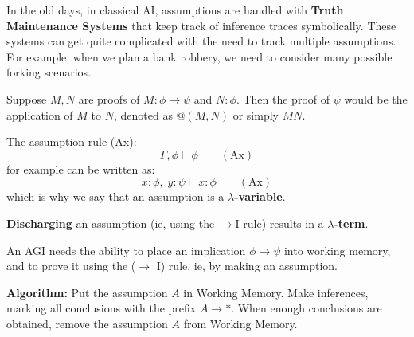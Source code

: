 In the old days, in classical AI, assumptions are handled with \textbf{Truth Maintenance Systems} that keep track of inference traces symbolically.  These systems can get quite complicated with the need to track multiple assumptions.  For example, when we plan a bank robbery, we need to consider many possible forking scenarios.  

Suppose $M, N$ are proofs of $M: \phi \rightarrow \psi$ and $N: \phi$.  Then the proof of $\psi$ would be the application of $M$ to $N$, denoted as $@(M, N)$ or simply $M N$.

The assumption rule (Ax):
\begin{equation}
\Gamma, \phi \vdash \phi \qquad (\mbox{Ax})
\end{equation}
for example can be written as:
\begin{equation}
x : \phi, \; y : \psi \vdash x : \phi \qquad (\mbox{Ax})
\end{equation}
which is why we say that an assumption is a \textbf{$\lambda$-variable}.  

\textbf{Discharging} an assumption (ie, using the $\rightarrow$I rule) results in a \textbf{$\lambda$-term}.

An AGI needs the ability to place an implication $\phi \rightarrow \psi$ into working memory, and to prove it using the ($\rightarrow$ I) rule, ie, by making an assumption.

\textbf{Algorithm:}  Put the assumption $A$ in Working Memory.  Make inferences, marking all conclusions with the prefix $A \rightarrow *$.  When enough conclusions are obtained, remove the assumption $A$ from Working Memory.


